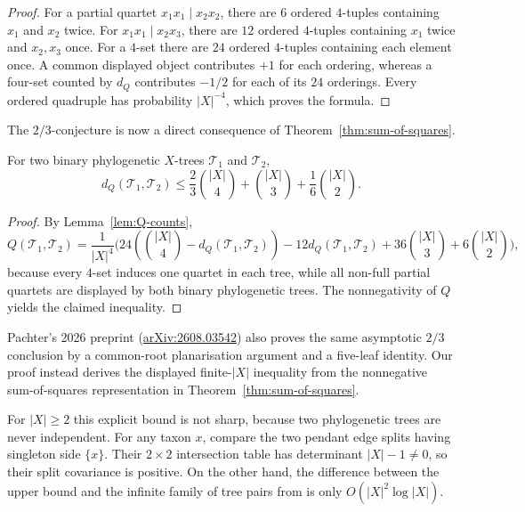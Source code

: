\documentclass[12pt]{article}
\begin{document}
\begin{proof}
For a partial quartet $x_1x_1\mid x_2x_2$, there are $6$ ordered
$4$-tuples containing $x_1$ and $x_2$ twice.  For
$x_1x_1\mid x_2x_3$, there are $12$ ordered $4$-tuples containing
$x_1$ twice and $x_2,x_3$ once.  For a $4$-set there are $24$
ordered $4$-tuples containing each element once.  A common displayed object
contributes $+1$ for each ordering, whereas a four-set counted by $d_Q$
contributes $-1/2$ for each of its $24$ orderings.  Every ordered quadruple
has probability $|X|^{-4}$, which proves the formula.
\end{proof}

The $2/3$-conjecture is now a direct consequence of
Theorem~\ref{thm:sum-of-squares}.

\begin{corollary}\label{cor:two-thirds}
For two binary phylogenetic $X$-trees $\mathcal T_1$ and $\mathcal T_2$,
\begin{equation}\label{eq:display-056}
d_Q(\mathcal T_1,\mathcal T_2)
\le\frac23\binom{|X|}{4}+\binom{|X|}{3}+\frac16\binom{|X|}{2}.
\end{equation}
\end{corollary}

\begin{proof}
By Lemma~\ref{lem:Q-counts},
\begin{equation}\label{eq:display-057}
Q(\mathcal T_1,\mathcal T_2)=\frac1{|X|^4}\Biggl(
24\left(\binom{|X|}{4}-d_Q(\mathcal T_1,\mathcal T_2)\right)
-12d_Q(\mathcal T_1,\mathcal T_2)
+36\binom{|X|}{3}+6\binom{|X|}{2}\Biggr),
\end{equation}
because every $4$-set induces one quartet in each tree, while all
non-full partial quartets are displayed by both binary phylogenetic
trees.  The nonnegativity of $Q$ yields the claimed inequality.
\end{proof}

Pachter's 2026 preprint
(\href{https://arxiv.org/abs/2608.03542}{arXiv:2608.03542}) also proves the
same asymptotic $2/3$ conclusion by a common-root planarisation argument and
a five-leaf identity.  Our proof instead derives the displayed finite-$|X|$ inequality from
the nonnegative sum-of-squares representation in
Theorem~\ref{thm:sum-of-squares}.

For $|X|\ge2$ this explicit bound is not sharp, because two phylogenetic
trees are never independent.  For any taxon $x$, compare the two pendant
edge splits having singleton side $\{x\}$.  Their $2\times2$ intersection
table has determinant $|X|-1\ne0$, so their split covariance is positive.
On the other hand, the difference
between the upper bound and the infinite family of tree pairs from
\cite{ChorErdosKomornik2019} is only $O(|X|^2\log|X|)$.
\end{document}
